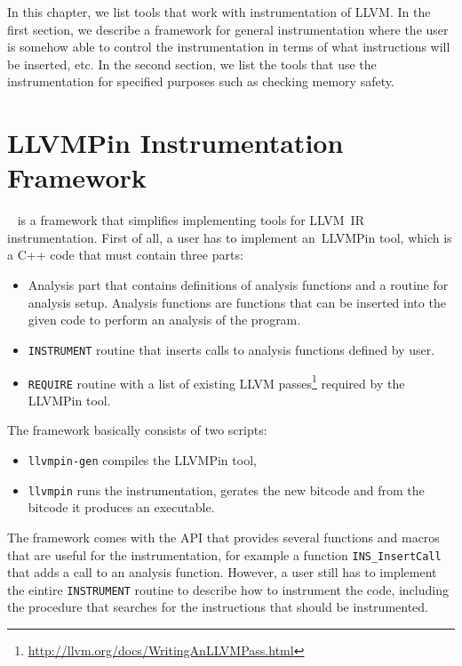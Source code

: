 In this chapter, we list tools that work with instrumentation of LLVM. In the
first section, we describe a framework for general instrumentation where the
user is somehow able to control the instrumentation in terms of what
instructions will be inserted, etc. In the second section, we list the tools
that use the instrumentation for specified purposes such as checking memory
safety.

\section{LLVMPin Instrumentation Framework}\label{sec:llvmpin}

\llvmpin~\cite{llvmpin} is a framework that simplifies implementing tools for
LLVM~IR instrumentation. First of all, a user has to implement an~LLVMPin tool,
which is a C++ code that must contain three parts:

\begin{itemize}
    \item Analysis part that contains definitions of analysis functions and a
    routine for analysis setup. Analysis functions are functions that can be
    inserted into the given code to perform an analysis of the program.
    \item \texttt{INSTRUMENT} routine that inserts calls to analysis functions
    defined by user.
    \item \texttt{REQUIRE} routine with a list of existing LLVM
    passes\footnote{\url{http://llvm.org/docs/WritingAnLLVMPass.html}} required
    by the LLVMPin tool.
\end{itemize}

The framework basically consists of two scripts:

\begin{itemize}
    \item \texttt{llvmpin-gen} compiles the LLVMPin tool,
    \item \texttt{llvmpin} runs the instrumentation, gerates the new bitcode
    and from the bitcode it produces an executable.
\end{itemize}

The framework comes with the API that provides several functions and macros
that are useful for the instrumentation, for example a function
\texttt{INS\_InsertCall} that adds a call to an analysis function. However, a
user still has to implement the eintire \texttt{INSTRUMENT} routine to describe
how to instrument the code, including the procedure that searches for the
instructions that should be instrumented.

